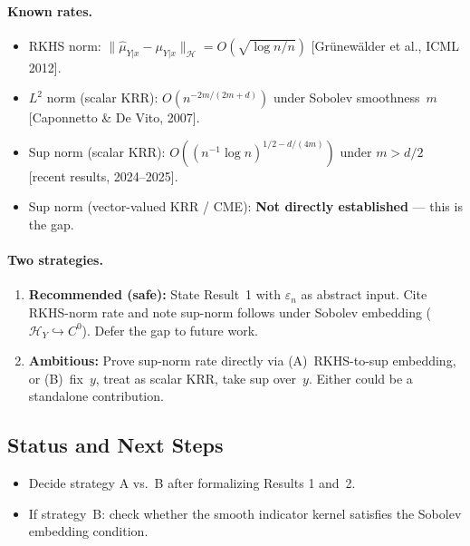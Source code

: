 \documentclass[11pt]{article}
\begin{document}
\paragraph{Known rates.}
\begin{itemize}
  \item RKHS norm:
    $\|\hat\mu_{Y|x} - \mu_{Y|x}\|_{\mathcal{H}}
    = O(\sqrt{\log n / n})$
    [Gr\"unew\"alder et al., ICML 2012].
  \item $L^2$ norm (scalar KRR):
    $O(n^{-2m/(2m+d)})$ under Sobolev smoothness~$m$
    [Caponnetto \& De Vito, 2007].
  \item Sup norm (scalar KRR):
    $O((n^{-1}\log n)^{1/2 - d/(4m)})$ under $m > d/2$
    [recent results, 2024--2025].
  \item Sup norm (vector-valued KRR / CME): \textbf{Not directly
    established} --- this is the gap.
\end{itemize}

\paragraph{Two strategies.}
\begin{enumerate}[label=(\Alph*)]
  \item \textbf{Recommended (safe):} State Result~1 with $\varepsilon_n$
    as abstract input. Cite RKHS-norm rate and note sup-norm follows
    under Sobolev embedding ($\mathcal{H}_Y \hookrightarrow C^0$).
    Defer the gap to future work.
  \item \textbf{Ambitious:} Prove sup-norm rate directly via
    (A)~RKHS-to-sup embedding, or (B)~fix~$y$, treat as scalar KRR,
    take sup over~$y$. Either could be a standalone contribution.
\end{enumerate}

\subsection{Status and Next Steps}

\begin{itemize}
  \item[$\square$] Decide strategy A vs.\ B after formalizing Results
    1 and~2.
  \item[$\square$] If strategy~B: check whether the smooth indicator
    kernel satisfies the Sobolev embedding condition.
\end{itemize}
\end{document}
